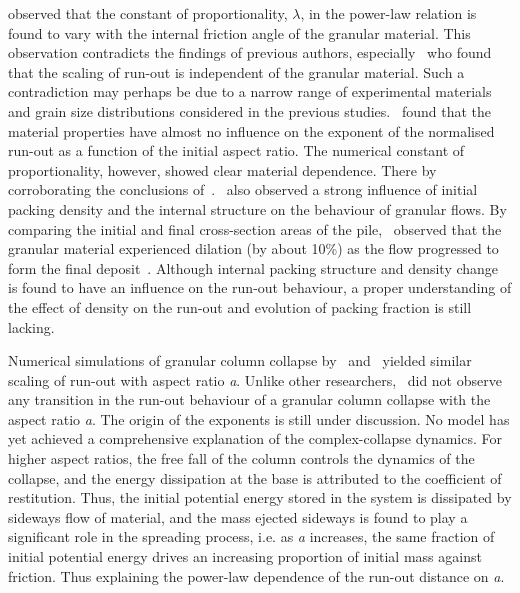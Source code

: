 \citet{Balmforth2005} observed that the constant of proportionality, $\lambda$, 
in the power-law relation is found to vary with the internal friction angle of 
the granular material. This observation contradicts the findings of previous 
authors, 
especially~\citet{Lube2005} who found that the scaling of run-out is 
independent of the granular material. Such a contradiction may perhaps be due 
to a narrow range 
of experimental materials and grain size distributions considered in 
the previous studies.~\citet{Balmforth2005} found that the material 
properties have almost no influence on the exponent of the normalised run-out 
as a function of the initial aspect ratio. The numerical constant of 
proportionality, however, showed clear material dependence. There by 
corroborating the conclusions of~\citet{Lajeunesse2004}.~\citet{Daerr1999} also 
observed a strong influence of initial packing density and the internal 
structure on the 
behaviour of granular flows. By comparing the initial and final cross-section 
areas of the pile,~\citet{Balmforth2005} observed that the granular material 
experienced dilation (by about 10\%) as the flow progressed to form the final 
deposit~\citep{Balmforth2005}. Although internal packing structure and 
density change is found to have an influence on the run-out behaviour, a proper 
understanding of the effect of density on the run-out and evolution of packing 
fraction is still lacking.


Numerical simulations of 
granular column collapse by~\citet{Zenit2005} and~\citet{Staron2007a} yielded 
similar scaling of run-out with aspect ratio \textit{a}. Unlike other 
researchers,~\citet{Zenit2005} did not observe any transition in the run-out 
behaviour of a granular column collapse with the aspect ratio \textit{a}. The 
origin of the exponents is still under discussion. No model has yet achieved a 
comprehensive explanation of the complex-collapse dynamics. For higher aspect 
ratios, the free fall of the column controls the dynamics of 
the collapse, and the energy dissipation at the base is attributed to the 
coefficient of restitution. Thus, the initial potential energy stored in the 
system is dissipated by sideways flow of material, and the mass ejected 
sideways is found to play a significant role in the spreading process, i.e. as 
\textit{a} increases, the same fraction of initial potential energy drives an 
increasing proportion of initial mass against friction. Thus explaining the 
power-law dependence of the run-out distance on \textit{a}. 

